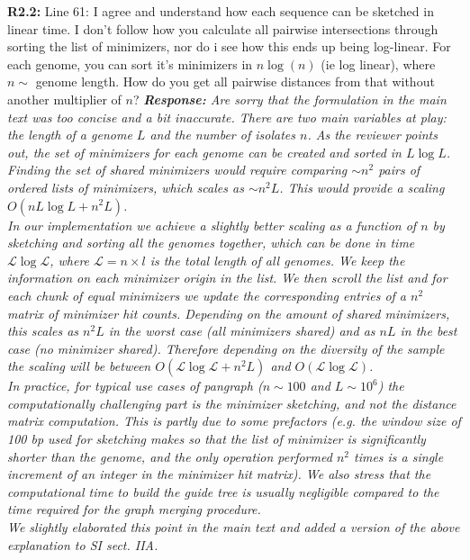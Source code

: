 \documentclass[aps,rmp,onecolumn]{revtex4-1}
\newcommand{\Marco}[1]{{\color{orange}Marco: #1}}
\newcommand{\Liam}[1]{{\color{teal}Liam: #1}}
\newcommand{\reviewer}[2]{\textbf{#1:} #2\vskip 5mm}
\newcommand{\response}[1]{{\it {\color{response}\textbf{Response:} #1}}\vskip 5mm}
\newcommand{\SIalgo}{II}
\begin{document}
\reviewer{R2.2}{Line 61: I agree and understand how each sequence can be sketched in linear time. I don't follow how you calculate all pairwise intersections through sorting the list of minimizers, nor do i see how this ends up being log-linear. For each genome, you can sort it's minimizers in $n \log (n)$ (ie log linear), where $n \sim$ genome length. How do you get all pairwise distances from that without another multiplier of $n$?}
\response{Are sorry that the formulation in the main text was too concise and a bit inaccurate.
There are two main variables at play: the length of a genome $L$ and the number of isolates $n$. 
As the reviewer points out, the set of minimizers for each genome can be created and sorted in $L \log L$. 
Finding the set of shared minimizers would require comparing $\sim n^2$ pairs of ordered lists of minimizers, which scales as $\sim n^2 L$. This would provide a scaling $O(n L \log L + n^2 L)$.\\
In our implementation we achieve a slightly better scaling as a function of $n$ by sketching and sorting all the genomes together, which can be done in time $\mathcal{L} \log \mathcal{L}$, where $\mathcal{L}= n \times l$ is the total length of all genomes. 
We keep the information on each minimizer origin in the list. We then scroll the list and for each chunk of equal minimizers we update the corresponding entries of a $n^2$ matrix of minimizer hit counts. 
Depending on the amount of shared minimizers, this scales as $n^2 L$ in the worst case (all minimizers shared) and as $n L$ in the best case (no minimizer shared). 
Therefore depending on the diversity of the sample the scaling will be between $O(\mathcal{L} \log \mathcal{L} + n^2 L)$ and $O(\mathcal{L} \log \mathcal{L})$.\\
In practice, for typical use cases of pangraph ($n \sim 100$ and $L \sim 10^6$) the computationally challenging part is the minimizer sketching, and not the distance matrix computation. This is partly due to some prefactors (e.g. the window size of 100 bp used for sketching makes so that the list of minimizer is significantly shorter than the genome, and the only operation performed $n^2$ times is a single increment of an integer in the minimizer hit matrix). We also stress that the computational time to build the guide tree is usually negligible compared to the time required for the graph merging procedure.\\
We slightly elaborated this point in the main text and added a version of the above explanation to SI sect. {\SIalgo}A.
}
\end{document}
